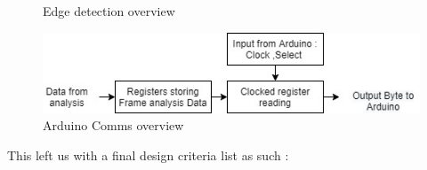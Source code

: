 \documentclass[10pt,twoside]{article}
\begin{document}
\begin{figure}[!htb]
\begin{minipage}{0.33\textwidth}
        \caption{Edge detection overview}
        \label{fig:EdgeDetectionOverview}
    \end{minipage}%
    \begin{minipage}{.33\textwidth}
        \centering
        \includegraphics[width=1\linewidth, height=0.08\textheight]{ArduinoComms.jpg}
        \caption{Arduino Comms overview}
        \label{fig:ArduinoComms}
    \end{minipage}%
\end{figure}


\newpage


This left us with a final design criteria list as such :
\end{document}
